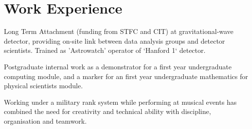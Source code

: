 \section{Work Experience}
 Long Term Attachment (funding from STFC and CIT) at gravitational-wave detector, providing on-site link between data analysis groups and detector scientists. Trained as 'Astrowatch' operator of `Hanford 1` detector.

 Postgraduate internal work as a demonstrator for a first year undergraduate computing module, and a marker for an first year undergraduate mathematics for physical scientists module.

 Working under a military rank system while
performing at musical events has combined the need for creativity
and technical ability with discipline, organisation and teamwork.
